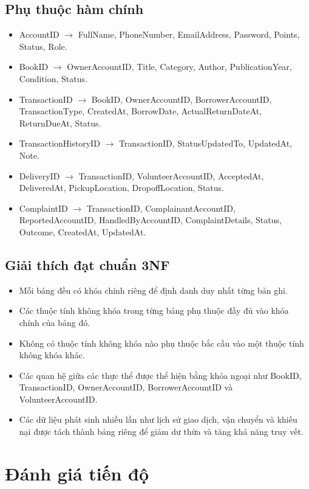 \documentclass{article}
\begin{document}
\subsection*{Phụ thuộc hàm chính}
\begin{itemize}
    \item AccountID $\rightarrow$ FullName, PhoneNumber, EmailAddress, Password, Points, Status, Role.
    \item BookID $\rightarrow$ OwnerAccountID, Title, Category, Author, PublicationYear, Condition, Status.
    \item TransactionID $\rightarrow$ BookID, OwnerAccountID, BorrowerAccountID, TransactionType, CreatedAt, BorrowDate, ActualReturnDateAt, ReturnDueAt, Status.
    \item TransactionHistoryID $\rightarrow$ TransactionID, StatusUpdatedTo, UpdatedAt, Note.
    \item DeliveryID $\rightarrow$ TransactionID, VolunteerAccountID, AcceptedAt, DeliveredAt, PickupLocation, DropoffLocation, Status.
    \item ComplaintID $\rightarrow$ TransactionID, ComplainantAccountID, ReportedAccountID, HandledByAccountID, ComplaintDetails, Status, Outcome, CreatedAt, UpdatedAt.
\end{itemize}

\subsection*{Giải thích đạt chuẩn 3NF}
\begin{itemize}
    \item Mỗi bảng đều có khóa chính riêng để định danh duy nhất từng bản ghi.
    \item Các thuộc tính không khóa trong từng bảng phụ thuộc đầy đủ vào khóa chính của bảng đó.
    \item Không có thuộc tính không khóa nào phụ thuộc bắc cầu vào một thuộc tính không khóa khác.
    \item Các quan hệ giữa các thực thể được thể hiện bằng khóa ngoại như BookID, TransactionID, OwnerAccountID, BorrowerAccountID và VolunteerAccountID.
    \item Các dữ liệu phát sinh nhiều lần như lịch sử giao dịch, vận chuyển và khiếu nại được tách thành bảng riêng để giảm dư thừa và tăng khả năng truy vết.
\end{itemize}

\section{Đánh giá tiến độ}
\end{document}
